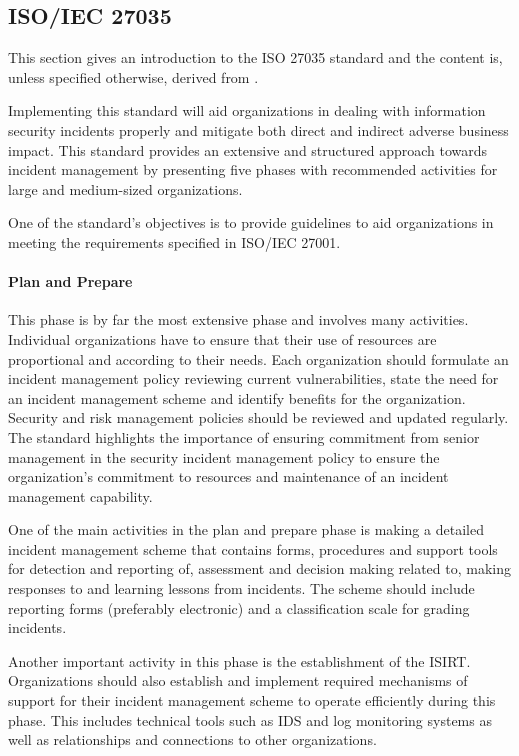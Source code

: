 \subsection{\acs{ISO}/\acs{IEC} 27035}
\label{sec:iso27035}
This section gives an introduction to the ISO 27035 standard and the content is, unless specified otherwise, derived from \cite{ISO/IEC27035}. 

Implementing this standard will aid organizations in dealing with information security incidents properly and mitigate both direct and indirect adverse business impact. This standard provides an extensive and structured approach towards incident management by presenting five phases with recommended activities for large and medium-sized organizations. 

One of the standard's objectives is to provide guidelines to aid organizations in meeting the requirements specified in ISO/IEC 27001. %

\paragraph{Plan and Prepare} This phase is by far the most extensive phase and involves many activities. Individual organizations have to ensure that their use of resources are proportional and according to their needs. Each organization should formulate an incident management policy reviewing current vulnerabilities, state the need for an incident management scheme and identify benefits for the organization. Security and risk management policies should be reviewed and updated regularly. The standard highlights the importance of ensuring commitment from senior management in the security incident management policy to ensure the organization's commitment to resources and maintenance of an incident management capability.  

One of the main activities in the plan and prepare phase is making a detailed incident management scheme that contains forms, procedures and support tools for detection and reporting of, assessment and decision making related to, making responses to and learning lessons from incidents. The scheme should include reporting forms (preferably electronic) and a classification scale for grading incidents.   

Another important activity in this phase is the establishment of the \acf{ISIRT}. Organizations should also establish and implement required mechanisms of support for their incident management scheme to operate efficiently during this phase. This includes technical tools such as IDS and log monitoring systems as well as relationships and connections to other organizations. 

